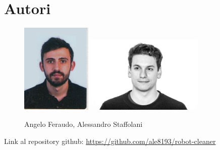 \documentclass{llncs}
\begin{document}
\section{Autori}
\label{Autori}
\begin{figure}
    \centering
    \includegraphics[width=0.3\textwidth]{Immagini/autore.jpeg}
    \includegraphics[width=0.5\textwidth]{Immagini/Alessandro.jpg}
    \caption{Angelo Feraudo, Alessandro Staffolani}
    \label{fig:my_label}
\end{figure}
Link al repository github: \url{https://github.com/ale8193/robot-cleaner}
\end{document}
